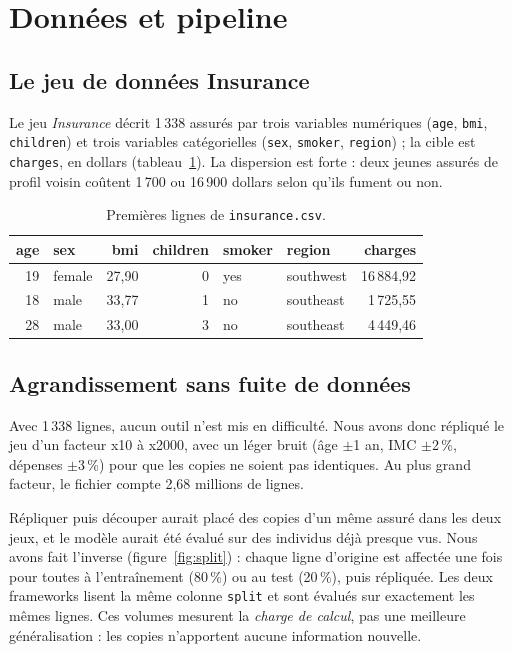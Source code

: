 \documentclass[11pt,a4paper]{article}
\newcommand{\code}[1]{\texttt{#1}}
\newcommand{\lin}{x}
\begin{document}
\section{Données et pipeline}

\subsection{Le jeu de données Insurance}

Le jeu \emph{Insurance} décrit 1\,338 assurés par trois variables numériques (\code{age}, \code{bmi},
\code{children}) et trois variables catégorielles (\code{sex}, \code{smoker}, \code{region}) ; la
cible est \code{charges}, en dollars (tableau~\ref{tab:extrait}). La dispersion est forte : deux
jeunes assurés de profil voisin coûtent 1\,700 ou 16\,900 dollars selon qu'ils fument ou non.

\begin{table}[H]
\centering
\caption{Premières lignes de \code{insurance.csv}.}
\label{tab:extrait}
\small
\begin{tabular}{r l r r l l r}
\toprule
age & sex & bmi & children & smoker & region & charges \\
\midrule
19 & female & 27,90 & 0 & yes & southwest & 16\,884,92 \\
18 & male & 33,77 & 1 & no & southeast & 1\,725,55 \\
28 & male & 33,00 & 3 & no & southeast & 4\,449,46 \\
\bottomrule
\end{tabular}
\end{table}

\subsection{Agrandissement sans fuite de données}

Avec 1\,338 lignes, aucun outil n'est mis en difficulté. Nous avons donc répliqué le jeu d'un facteur
\lin10 à \lin2000, avec un léger bruit (âge $\pm$1 an, IMC $\pm$2\,\%, dépenses $\pm$3\,\%) pour que
les copies ne soient pas identiques. Au plus grand facteur, le fichier compte 2,68 millions de lignes.

Répliquer puis découper aurait placé des copies d'un même assuré dans les deux jeux, et le modèle
aurait été évalué sur des individus déjà presque vus. Nous avons fait l'inverse
(figure~\ref{fig:split}) : chaque ligne d'origine est affectée une fois pour toutes à l'entraînement
(80\,\%) ou au test (20\,\%), puis répliquée. Les deux frameworks lisent la même colonne \code{split}
et sont évalués sur exactement les mêmes lignes. Ces volumes mesurent la \emph{charge de calcul}, pas
une meilleure généralisation : les copies n'apportent aucune information nouvelle.
\end{document}
